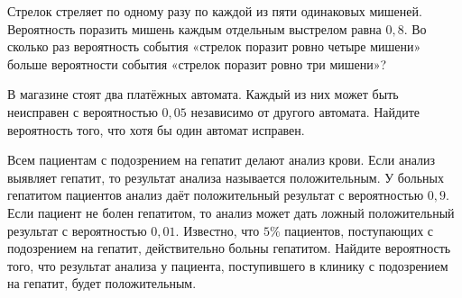 \begin{class}[number=4]
\begin{listofex}
		\item Стрелок стреляет по одному разу по каждой из пяти одинаковых мишеней. Вероятность поразить мишень каждым отдельным выстрелом равна \( 0,8 \). Во сколько раз вероятность события «стрелок поразит ровно четыре мишени» больше вероятности события «стрелок поразит ровно три мишени»?
		\item В магазине стоят два платёжных автомата. Каждый из них может быть неисправен с вероятностью \( 0,05 \)  независимо от другого автомата. Найдите вероятность того, что хотя бы один автомат исправен.
		\item Всем пациентам с подозрением на гепатит делают анализ крови. Если анализ выявляет гепатит, то результат анализа называется положительным. У больных гепатитом пациентов анализ даёт положительный результат с вероятностью \( 0,9 \). Если пациент не болен гепатитом, то анализ может дать ложный положительный результат с вероятностью \( 0,01 \). Известно, что \( 5\% \) пациентов, поступающих с подозрением на гепатит, действительно больны гепатитом. Найдите вероятность того, что результат анализа у пациента, поступившего в клинику с подозрением на гепатит, будет положительным.		
	\end{listofex}
\end{class}

